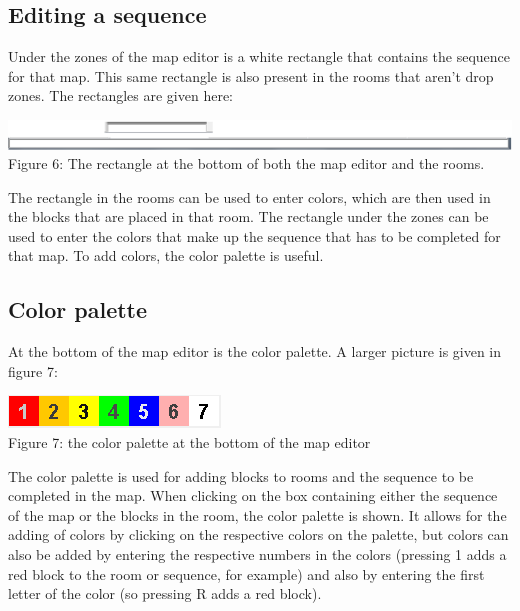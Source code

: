 \subsection{Editing a sequence}
Under the zones of the map editor is a white rectangle that contains the sequence for that map. This same rectangle is also present in the rooms that aren't drop zones. The rectangles are given here:
\begin{center}
	\centering
	\includegraphics[scale=0.5]{EnvironmentStore/SequenceEditor.png}\\
	Figure 6: The rectangle at the bottom of both the map editor and the rooms.
\end{center}
The rectangle in the rooms can be used to enter colors, which are then used in the blocks that are placed in that room. The rectangle under the zones can be used to enter the colors that make up the sequence that has to be completed for that map. To add colors, the color palette is useful.
\subsection{Color palette}
At the bottom of the map editor is the color palette. A larger picture is given in figure 7:
\begin{center}
	\centering
	\includegraphics{EnvironmentStore/ColorPalette.png}\\
	Figure 7: the color palette at the bottom of the map editor
\end{center}
The color palette is used for adding blocks to rooms and the sequence to be completed in the map. When clicking on the box containing either the sequence of the map or the blocks in the room, the color palette is shown. It allows for the adding of colors by clicking on the respective colors on the palette, but colors can also be added by entering the respective numbers in the colors (pressing 1 adds a red block to the room or sequence, for example) and also by entering the first letter of the color (so pressing R adds a red block).

